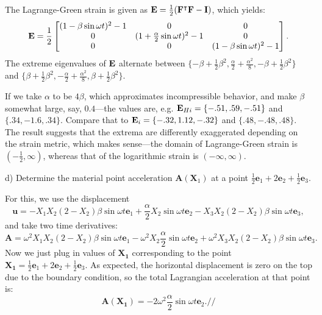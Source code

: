 The Lagrange-Green strain is given as $\mathbf{E} = \frac{1}{2}(\mathbf{F}^\intercal \mathbf{F} - \mathbf{I})$, which yields:
\begin{equation*}
\mathbf{E} = \frac{1}{2}\begin{bmatrix}
 (1 - \beta \sin\omega t)^2-1 & 0 & 0 \\
 0 & (1 + \frac{\alpha}{2} \sin\omega t)^2-1 & 0 \\
 0 & 0 & (1- \beta \sin\omega t)^2-1
 \end{bmatrix}. 
\end{equation*}
The extreme eigenvalues of $\mathbf{E}$ alternate between $\{-\beta+\frac{1}{2}\beta^2, \frac{\alpha}{2} + \frac{\alpha^2}{8}, -\beta+\frac{1}{2}\beta^2 \}$ and $\{\beta+\frac{1}{2}\beta^2, -\frac{\alpha}{2} + \frac{\alpha^2}{8}, \beta+\frac{1}{2}\beta^2 \}$. 

If we take $\alpha$ to be $4 \beta$, which approximates incompressible behavior, and make $\beta$ somewhat large, say, $0.4$---the values are, e.g. $\mathbf{E}_{Hi} = \{-.51, .59, -.51 \}$ and $ \{.34,-1.6, .34\}$. 
Compare that to $\mathbf{E}_i = \{-.32, 1.12, -.32 \}$ and $ \{.48,-.48, .48\}$.
The result suggests that the extrema are differently exaggerated depending on the strain metric, which makes sense---the domain of Lagrange-Green strain is $(-\frac{1}{2}, \infty)$, whereas that of the logarithmic strain is $(-\infty, \infty)$. 

d) Determine the material point acceleration $\bm{A}(\bm{X}_1)$ at a point $\frac{1}{2} \bm{e}_1 + 2\bm{e}_2 + \frac{1}{2} \bm{e}_3$.  

For this, we use the displacement 
\begin{equation*}
    \bm{u} =  -X_1 X_2 (2-X_2)\beta \sin\omega t \bm{e}_1 + \frac{\alpha}{2} X_2 \sin\omega t \bm{e}_2  -X_3 X_2 (2-X_2)\beta \sin\omega t \bm{e}_3,
\end{equation*}
and take two time derivatives: 
\begin{equation*}
    \bm{A} =  \omega^2 X_1 X_2 (2-X_2)\beta \sin\omega t \bm{e}_1 - \omega^2 X_2 \frac{\alpha}{2} \sin\omega t \bm{e}_2 +\omega^2 X_3 X_2 (2-X_2)\beta \sin\omega t \bm{e}_3.
\end{equation*}
Now we just plug in values of $\bm{X_1}$ corresponding to the point $\bm{X_1} = \frac{1}{2} \bm{e}_1 + 2\bm{e}_2 + \frac{1}{2} \bm{e}_3$. As expected, the horizontal displacement is zero on the top due to the boundary condition, so the total Lagrangian acceleration at that point is: 
\begin{equation*}
    \bm{A}(\bm{X_1}) =   - 2 \omega^2 \frac{\alpha}{2} \sin\omega t \bm{e}_2.// 
\end{equation*}


